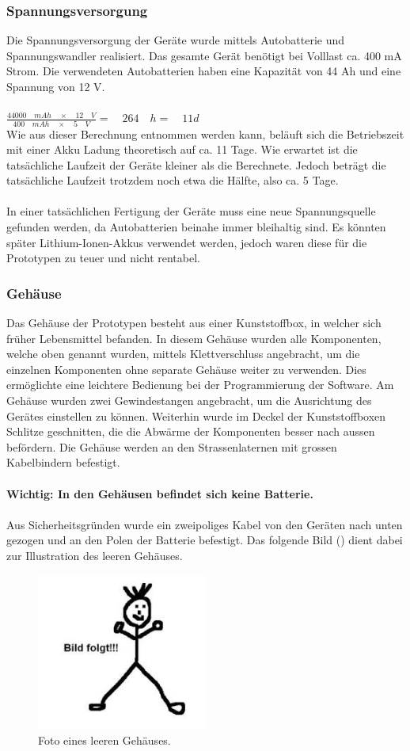 \subsubsection{Spannungsversorgung}
Die Spannungsversorgung der Geräte wurde mittels Autobatterie und Spannungswandler realisiert. Das gesamte Gerät benötigt bei Volllast ca. 400 mA Strom. Die verwendeten Autobatterien haben eine Kapazität von 44 Ah und eine Spannung von 12 V. \\\\

$\frac { 44000\quad mAh\quad \times \quad 12\quad V }{ 400\quad mAh\quad \times \quad 5\quad V } =\quad 264\quad h=\quad 11 d$ \\

Wie aus dieser Berechnung entnommen werden kann, beläuft sich die Betriebszeit mit einer Akku Ladung theoretisch auf ca. 11 Tage. Wie erwartet ist die tatsächliche Laufzeit der Geräte kleiner als die Berechnete. Jedoch beträgt die tatsächliche Laufzeit trotzdem noch etwa die Hälfte, also ca. 5 Tage. \\\\
In einer tatsächlichen Fertigung der Geräte muss eine neue Spannungsquelle gefunden werden, da Autobatterien beinahe immer bleihaltig sind. Es könnten später Lithium-Ionen-Akkus verwendet werden, jedoch waren diese für die Prototypen zu teuer und nicht rentabel. 

\subsubsection{Gehäuse}
Das Gehäuse der Prototypen besteht aus einer Kunststoffbox, in welcher sich früher Lebensmittel befanden. In diesem Gehäuse wurden alle Komponenten, welche oben genannt wurden, mittels Klettverschluss angebracht, um die einzelnen Komponenten ohne separate Gehäuse weiter zu verwenden. Dies ermöglichte eine leichtere Bedienung bei der Programmierung der Software. Am Gehäuse wurden zwei Gewindestangen angebracht, um die Ausrichtung des Gerätes einstellen zu können. Weiterhin wurde im Deckel der Kunststoffboxen Schlitze geschnitten, die die Abwärme der Komponenten besser nach aussen befördern. Die Gehäuse werden an den Strassenlaternen mit grossen Kabelbindern befestigt.\\\\
\textbf{Wichtig: In den Gehäusen befindet sich keine Batterie.}\\\\
Aus Sicherheitsgründen wurde ein zweipoliges Kabel von den Geräten nach unten gezogen und an den Polen der Batterie befestigt. Das folgende Bild () dient dabei zur Illustration des leeren Gehäuses.

\begin{figure}[H]
  \centering
  \includegraphics[width=0.5\textwidth]{Hardware/Gehaeuse.jpg} 
  \caption{Foto eines leeren Gehäuses.}
  \label{bGehäuse}
\end{figure}